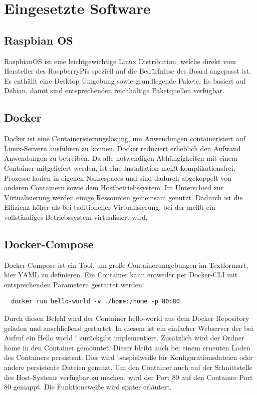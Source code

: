 \section{Eingesetzte Software}

\subsection{Raspbian OS}

RaspbianOS ist eine leichtgewichtige Linux Distribution, welche direkt vom Hersteller des RaspberryPis speziell auf die Bedürfnisse des Board angepasst ist. Es enthällt eine
Desktop Umgebung sowie grundlegende Pakete. Es basiert auf Debian, damit sind entsprechenden reichhaltige Paketquellen verfügbar. 

\subsection{Docker}

Docker ist eine Containerisierungslösung, um Anwendungen containerisiert auf Linux-Servern ausführen zu können. Docker reduziert erheblich den Aufwand 
Anwendungen zu betreiben. Da alle notwendigen Abhängigkeiten mit einem Container mitgeliefert werden, ist eine Installation meißt komplikationsfrei.
Prozesse laufen in eigenen Namespaces und sind dadurch abgekoppelt von anderen Containern sowie dem Hostbetriebssystem. Im Unterschied zur Virtualisierung werden
einige Ressourcen gemeinsam genutzt. Dadurch ist die Effizienz höher als bei taditioneller Virtualisierung, bei der meißt ein vollständiges Betriebssystem virtualisiert wird.

\subsection{Docker-Compose}

Docker-Compose ist ein Tool, um große Containerumgebungen im Textformart, hier \grqq YAML \grqq{} zu definieren.
Ein Container kann entweder per Docker-CLI mit entsprechenden Parametern gestartet werden:
\begin{lstlisting}
  docker run hello-world -v ./home:/home -p 80:80
\end{lstlisting}

Durch diesen Befehl wird der Container \grqq hello-world \grqq aus dem Docker Repository geladen und anschließend gestartet. In diesem ist ein einfacher Webserver der bei
Aufruf ein \grqq Hello world ! \grqq{} zurückgibt implementiert. Zusätzlich wird der Ordner \grqq home \grqq{} in den Container gemountet. Dieser bleibt auch bei einem
erneuten Laden des Containers persistent. Dies wird beispielweiße für Konfigurationsdateien oder andere persistente Dateien genutzt. Um den Container auch auf der Schnittstelle
des Host-Systems verfügbar zu machen, wird der Port 80 auf den Container Port 80 gemappt. Die Funktionsweiße wird später erläutert.

